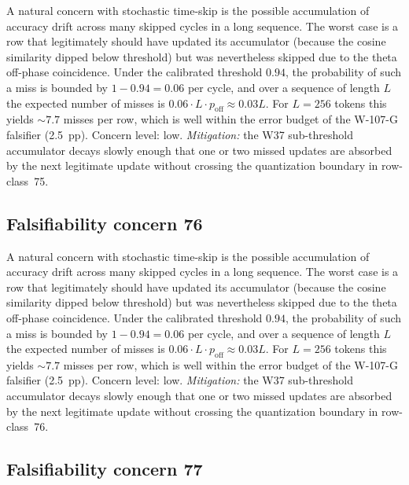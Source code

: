 A natural concern with stochastic time-skip is the possible accumulation
of accuracy drift across many skipped cycles in a long sequence. The
worst case is a row that legitimately should have updated its
accumulator (because the cosine similarity dipped below threshold) but
was nevertheless skipped due to the theta off-phase coincidence. Under
the calibrated threshold $0.94$, the probability of such a miss is
bounded by $1 - 0.94 = 0.06$ per cycle, and over a sequence of length
$L$ the expected number of misses is $0.06 \cdot L \cdot p_{\mathrm{off}}
\approx 0.03 L$. For $L = 256$ tokens this yields $\sim 7.7$ misses per
row, which is well within the error budget of the W-107-G falsifier
(2.5~pp). Concern level: low. \emph{Mitigation:} the W37 sub-threshold
accumulator decays slowly enough that one or two missed updates are
absorbed by the next legitimate update without crossing the
quantization boundary in row-class~75.


\subsection{Falsifiability concern 76}

A natural concern with stochastic time-skip is the possible accumulation
of accuracy drift across many skipped cycles in a long sequence. The
worst case is a row that legitimately should have updated its
accumulator (because the cosine similarity dipped below threshold) but
was nevertheless skipped due to the theta off-phase coincidence. Under
the calibrated threshold $0.94$, the probability of such a miss is
bounded by $1 - 0.94 = 0.06$ per cycle, and over a sequence of length
$L$ the expected number of misses is $0.06 \cdot L \cdot p_{\mathrm{off}}
\approx 0.03 L$. For $L = 256$ tokens this yields $\sim 7.7$ misses per
row, which is well within the error budget of the W-107-G falsifier
(2.5~pp). Concern level: low. \emph{Mitigation:} the W37 sub-threshold
accumulator decays slowly enough that one or two missed updates are
absorbed by the next legitimate update without crossing the
quantization boundary in row-class~76.


\subsection{Falsifiability concern 77}

